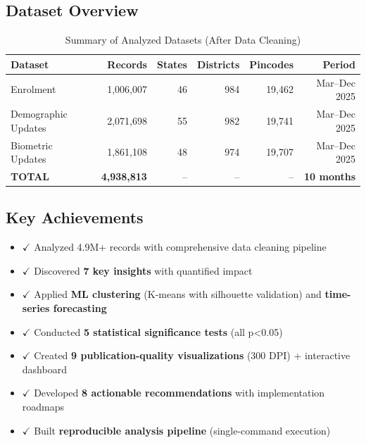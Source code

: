 \documentclass[12pt,a4paper]{article}
\begin{document}
\subsection{Dataset Overview}

\begin{table}[H]
\centering
\small
\setlength{\tabcolsep}{4pt}
\caption{Summary of Analyzed Datasets (After Data Cleaning)}
\begin{tabular}{lrrrrr}
\toprule
\textbf{Dataset} & \textbf{Records} & \textbf{States} & \textbf{Districts} & \textbf{Pincodes} & \textbf{Period} \\
\midrule
Enrolment & 1,006,007 & 46 & 984 & 19,462 & Mar--Dec 2025 \\
Demographic Updates & 2,071,698 & 55 & 982 & 19,741 & Mar--Dec 2025 \\
Biometric Updates & 1,861,108 & 48 & 974 & 19,707 & Mar--Dec 2025 \\
\midrule
\textbf{TOTAL} & \textbf{4,938,813} & -- & -- & -- & \textbf{10 months} \\
\bottomrule
\end{tabular}
\end{table}

\subsection{Key Achievements}

\begin{itemize}[leftmargin=*]
    \item \textcolor{uidaigreen}{\ensuremath{\checkmark}} Analyzed 4.9M+ records with comprehensive data cleaning pipeline
    \item \textcolor{uidaigreen}{\ensuremath{\checkmark}} Discovered \textbf{7 key insights} with quantified impact
    \item \textcolor{uidaigreen}{\ensuremath{\checkmark}} Applied \textbf{ML clustering} (K-means with silhouette validation) and \textbf{time-series forecasting}
    \item \textcolor{uidaigreen}{\ensuremath{\checkmark}} Conducted \textbf{5 statistical significance tests} (all p<0.05)
    \item \textcolor{uidaigreen}{\ensuremath{\checkmark}} Created \textbf{9 publication-quality visualizations} (300 DPI) + interactive dashboard
    \item \textcolor{uidaigreen}{\ensuremath{\checkmark}} Developed \textbf{8 actionable recommendations} with implementation roadmaps
    \item \textcolor{uidaigreen}{\ensuremath{\checkmark}} Built \textbf{reproducible analysis pipeline} (single-command execution)
\end{itemize}
\end{document}
